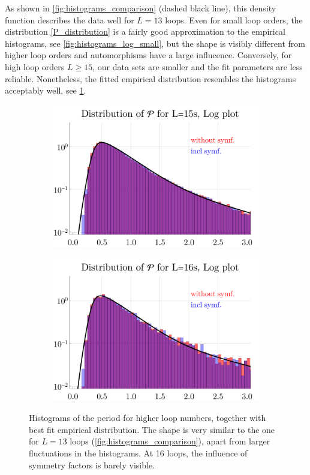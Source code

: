 \documentclass[12pt,a4paper]{article}
\renewcommand{\|}{\rule[-0.4ex]{0.2ex}{1.2em}}
\begin{document}
As shown in \cref{fig:histograms_comparison} (dashed black line), this density function describes the data well for $L=13$ loops. 
Even for small loop orders, the distribution \cref{P_distribution} is a fairly good approximation to the empirical histograms, see \cref{fig:histograms_log_small}, but the shape is visibly different from higher loop orders and automorphisms have a large influcence. 
Conversely, for high loop orders $L\geq 15$, our data sets are smaller and the fit parameters are less reliable. Nonetheless, the fitted empirical distribution resembles the histograms acceptably well, see \cref{fig:histograms_log_big}.


\begin{figure}[htbp]
	\centering
	\begin{subfigure}[b]{.48 \textwidth}
		\includegraphics[width=\linewidth]{distribution_P_15_log}
		\subcaption{}
	\end{subfigure}
	\begin{subfigure}[b]{.48 \textwidth}
		\includegraphics[width=\linewidth]{distribution_P_16_log}
		\subcaption{}
	\end{subfigure}
	
	\caption{Histograms of the period for higher loop numbers, together with best fit empirical distribution. The shape  is very similar to the one for $L=13$ loops (\cref{fig:histograms_comparison}), apart from larger fluctuations in the histograms. At 16 loops, the influence of symmetry factors is barely visible. }
	\label{fig:histograms_log_big}
\end{figure}
\end{document}

